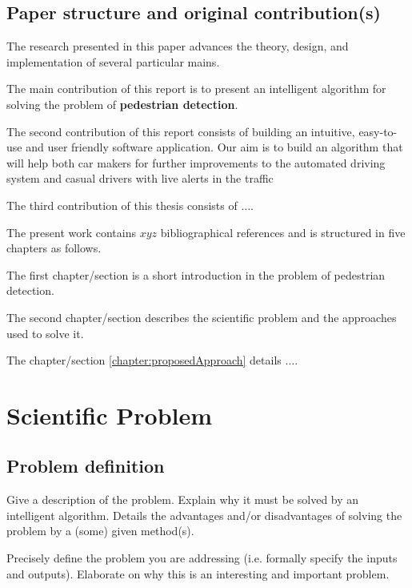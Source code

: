 \documentclass[runningheads,a4paper,11pt]{report}
\begin{document}
\section{Paper structure and original contribution(s)}
\label{section:structure}

The research presented in this paper advances the theory, design, and implementation of several particular mains. 

The main contribution of this report is to present an intelligent algorithm for solving the problem of \textbf{pedestrian detection}.

The second contribution of this report consists of building an intuitive, easy-to-use and user
friendly software application. Our aim is to build an algorithm that will help both car makers for further improvements to the automated driving system and casual drivers with live alerts in the traffic

The third contribution of this thesis consists of $\ldots$.


The present work contains $xyz$ bibliographical references and is structured in five chapters as follows.

The first chapter/section is a short introduction in the problem of pedestrian detection.

The second chapter/section describes the scientific problem and the approaches used to solve it.

The chapter/section \ref{chapter:proposedApproach} details $\ldots$.



\chapter{Scientific Problem}
\label{section:scientificProblem}


\section{Problem definition}
\label{section:problemDefinition}

Give a description of the problem.
Explain why it must be solved by an intelligent algorithm. 
Details the advantages and/or disadvantages of solving the problem by a (some) given method(s).

Precisely define the problem you are addressing (i.e. formally specify the inputs and outputs). Elaborate on why this is an interesting and important problem.
\end{document}

